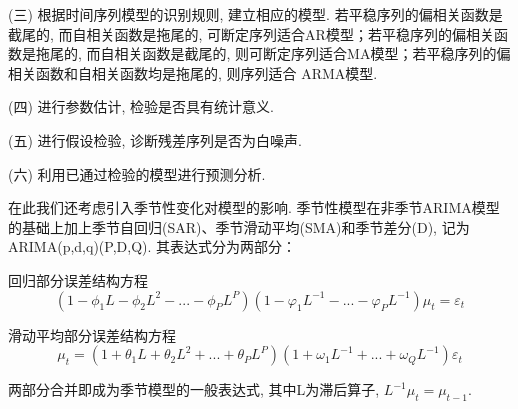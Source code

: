\documentclass[12pt]{article}
\begin{document}
\qquad  (三) 根据时间序列模型的识别规则, 建立相应的模型. 若平稳序列的偏相关函数是截尾的, 而自相关函数是拖尾的, 可断定序列适合AR模型；若平稳序列的偏相关函数是拖尾的, 而自相关函数是截尾的, 则可断定序列适合MA模型；若平稳序列的偏相关函数和自相关函数均是拖尾的, 则序列适合 ARMA模型. 

\qquad  (四) 进行参数估计, 检验是否具有统计意义. 

\qquad  (五) 进行假设检验, 诊断残差序列是否为白噪声. 

\qquad  (六) 利用已通过检验的模型进行预测分析. 

\qquad 在此我们还考虑引入季节性变化对模型的影响. 季节性模型在非季节ARIMA模型的基础上加上季节自回归(SAR)、季节滑动平均(SMA)和季节差分(D), 记为ARIMA(p,d,q)(P,D,Q). 其表达式分为两部分：

回归部分误差结构方程
\[(1-\phi_1L-\phi_2L^2-...-\phi_PL^P)(1-\varphi_1L^{-1}-...-\varphi_PL^{-1})\mu_t=\varepsilon_t\]

滑动平均部分误差结构方程\[\mu_t=(1+\theta_1L+\theta_2L^2+...+\theta_PL^P)(1+\omega_1L^{-1}+...+\omega_QL^{-1})\varepsilon_t\]

两部分合并即成为季节模型的一般表达式, 其中L为滞后算子, $L^{-1}\mu_t=\mu_{t-1}$. 
\end{document}
